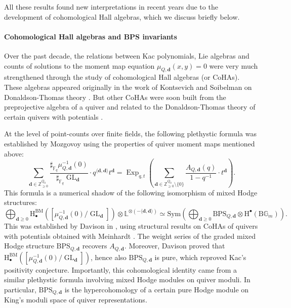 \documentclass[11pt,english]{article}
\numberwithin{equation}{section}
\numberwithin{figure}{section}
\theoremstyle{definition}
\theoremstyle{plain}
\theoremstyle{remark}
\DeclareMathOperator{\GL}{GL}
\DeclareMathOperator{\Exp}{Exp}
\newcommand\dd{\mathbf{d}}
\newcommand\HH{\mathrm{H}}
\newcommand\ZZ{\mathbb{Z}}
\newcommand\FF{\mathbb{F}}
\begin{document}
All these results found new interpretations in recent years due to
the development of cohomological Hall algebras, which we discuss briefly
below.

\paragraph*{Cohomological Hall algebras and BPS invariants}

Over the past decade, the relations between Kac polynomials, Lie algebras
and counts of solutions to the moment map equation $\mu_{Q,\dd}(x,y)=0$
were very much strengthened through the study of cohomological Hall
algebras (or CoHAs). These algebras appeared originally in the work
of Kontsevich and Soibelman on Donaldson-Thomas theory \cite{KS11}.
But other CoHAs were soon built from the preprojective algebra of
a quiver \cite{SV13b,YZ18a} and related to the Donaldson-Thomas theory
of certain quivers with potentials \cite{Moz11a,Dav17,RS17,YZ20}.

At the level of point-counts over finite fields, the following plethystic
formula was established by Mozgovoy \cite{Moz11a} using the properties
of quiver moment maps mentioned above:\[
\sum_{\dd\in\ZZ_{\geq0}^{Q_0}}
\frac{\sharp_{\FF_q}\mu_{Q,\dd}^{-1}(0)}{\sharp_{\FF_q}\GL_{\dd}}
\cdot q^{\langle\dd,\dd\rangle}t^{\dd}
=
\Exp_{q,t}\left(
\sum_{\dd\in\ZZ_{\geq0}^{Q_0}\setminus\{0\}}
\frac{A_{Q,\dd}(q)}{1-q^{-1}}\cdot t^{\dd}
\right).
\]This formula is a numerical shadow of the following isomorphism of
mixed Hodge structures:\[
\bigoplus_{\dd\geq0}
\HH_{\bullet}^{\mathrm{BM}}\left(\left[\mu_{Q,\dd}^{-1}(0)/\GL_{\dd}\right]\right)\otimes\mathbb{L}^{\otimes (-\langle\dd,\dd\rangle)}
\simeq
\mathrm{Sym}
\left(
\bigoplus_{\dd\geq0}\mathrm{BPS}_{Q,\dd}\otimes \HH^{\bullet}(\mathrm{B}\mathbb{G}_m)
\right).
\]This was established by Davison in \cite{Dav23c}, using structural
results on CoHAs of quivers with potentials obtained with Meinhardt
\cite{DM20}. The weight series of the graded mixed Hodge structure
$\mathrm{BPS}_{Q,\dd}$ recovers $A_{Q,\dd}$. Moreover, Davison proved
that $\HH_{\bullet}^{\mathrm{BM}}\left(\left[\mu_{Q,\dd}^{-1}(0)/\GL_{\dd}\right]\right)$,
hence also $\mathrm{BPS}_{Q,\dd}$ is pure, which reproved Kac's positivity
conjecture. Importantly, this cohomological identity came from a similar
plethystic formula involving mixed Hodge modules on quiver moduli.
In particular, $\mathrm{BPS}_{Q,\dd}$ is the hypercohomology of a
certain pure Hodge module on King's moduli space of quiver representations.
\end{document}
